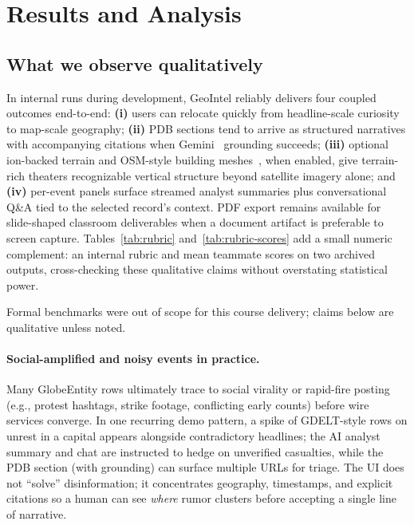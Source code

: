 \section{Results and Analysis}

\subsection{What we observe qualitatively}

In internal runs during development, GeoIntel reliably delivers four coupled outcomes end-to-end: \textbf{(i)} users can relocate quickly from headline-scale curiosity to map-scale geography; \textbf{(ii)} PDB sections tend to arrive as structured narratives with accompanying citations when Gemini~\cite{gemini-api} grounding succeeds; \textbf{(iii)} optional ion-backed terrain and OSM-style building meshes~\cite{cesium}, when enabled, give terrain-rich theaters recognizable vertical structure beyond satellite imagery alone; and \textbf{(iv)} per-event panels surface streamed analyst summaries plus conversational Q\&A tied to the selected record's context. PDF export remains available for slide-shaped classroom deliverables when a document artifact is preferable to screen capture.
Tables~\ref{tab:rubric} and~\ref{tab:rubric-scores} add a small numeric complement: an internal rubric and mean teammate scores on two archived outputs, cross-checking these qualitative claims without overstating statistical power.

Formal benchmarks were out of scope for this course delivery; claims below are qualitative unless noted.

\paragraph{Social-amplified and noisy events in practice.}
Many GlobeEntity rows ultimately trace to social virality or rapid-fire posting (e.g., protest hashtags, strike footage, conflicting early counts) before wire services converge. In one recurring demo pattern, a spike of GDELT-style rows on unrest in a capital appears alongside contradictory headlines; the AI analyst summary and chat are instructed to hedge on unverified casualties, while the PDB section (with grounding) can surface multiple URLs for triage. The UI does not ``solve'' disinformation; it concentrates geography, timestamps, and explicit citations so a human can see \emph{where} rumor clusters before accepting a single line of narrative.

